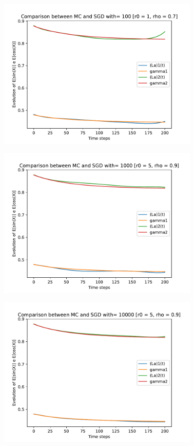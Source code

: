 \documentclass[a4paper,11pt,openright]{report}
\begin{document}
\begin{figure}[H]
\centering
\includegraphics[width=0.9\textwidth]{images/graphs T = 2/n = 6, M = 100 sine and cosine.pdf}
\end{figure}
\begin{figure}[H]
\centering
\includegraphics[width=0.9\textwidth]{images/graphs T = 2/n = 6, M = 1000 sine and cosine.pdf}
\end{figure}
\begin{figure}[H]
\centering
\includegraphics[width=0.9\textwidth]{images/graphs T = 2/n = 6, M = 10000 sine and cosine.pdf}
\end{figure}
\newpage
\end{document}

